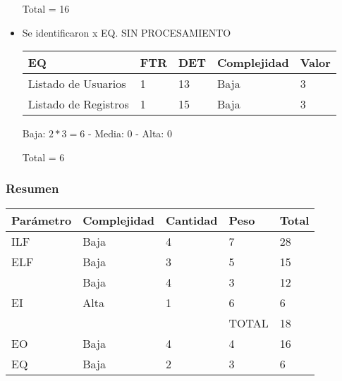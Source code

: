 \begin{itemize}
    Total = 16
    
    \item Se identificaron x EQ. SIN PROCESAMIENTO

    \begin{table}[H]
        \centering
        \begin{tabular}{|l|l|l|l|l|}
            \hline
            EQ                      & FTR & DET & Complejidad & Valor \\ \hline
            Listado de Usuarios     & 1   & 13  & Baja        & 3     \\ \hline
            Listado de Registros    & 1   & 15  & Baja        & 3     \\
            \hline
        \end{tabular}
    \end{table}
    
    Baja: $2 * 3 = 6$ -
    Media: 0 -
    Alta: 0 

    Total = 6
    
\end{itemize}

    \subsubsection{Resumen}
    
    \begin{table}[H]
        \centering
        \begin{tabular}{|l|l|l|l|l|}
            \hline
                    Parámetro & Complejidad & Cantidad & Peso & Total   \\ \hline
                    ILF       & Baja        & 4        & 7    & 28      \\ \hline
                    ELF       & Baja        & 3        & 5    & 15      \\ \hline
    \multirow{3}{*}{EI}       & Baja        & 4        & 3    & 12      \\ \cline{2-5}
                              & Alta        & 1        & 6    & 6       \\ \cline{2-5}
                              &             &          & TOTAL    & 18  \\ \hline
                    EO        & Baja        & 4        & 4    & 16      \\ \hline
                    EQ        & Baja        & 2        & 3    & 6       \\ \hline
    \end{tabular}
\end{table}
    
